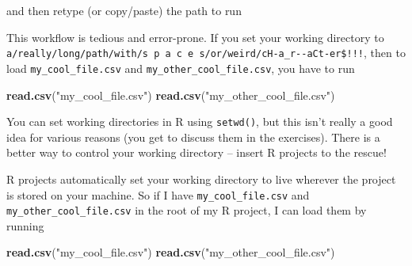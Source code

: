 \documentclass[
]{book}
\newenvironment{Shaded}{\begin{snugshade}}{\end{snugshade}}
\newcommand{\KeywordTok}[1]{\textcolor[rgb]{0.13,0.29,0.53}{\textbf{#1}}}
\newcommand{\NormalTok}[1]{#1}
\newcommand{\StringTok}[1]{\textcolor[rgb]{0.31,0.60,0.02}{#1}}
\begin{document}
\begin{Shaded}
\end{Shaded}

and then retype (or copy/paste) the path to run

\begin{Shaded}
\end{Shaded}

This workflow is tedious and error-prone. If you set your working directory to \texttt{a/really/long/path/with/s\ p\ a\ c\ e\ s/or/weird/cH-a\_r-\/-aCt-er\$!!!}, then to load \texttt{my\_cool\_file.csv} and \texttt{my\_other\_cool\_file.csv}, you have to run

\begin{Shaded}
\begin{Highlighting}[]
\KeywordTok{read.csv}\NormalTok{(}\StringTok{"my_cool_file.csv"}\NormalTok{)}
\KeywordTok{read.csv}\NormalTok{(}\StringTok{"my_other_cool_file.csv"}\NormalTok{)}
\end{Highlighting}
\end{Shaded}

You can set working directories in R using \texttt{setwd()}, but this isn't really a good idea for various reasons (you get to discuss them in the exercises). There is a better way to control your working directory -- insert R projects to the rescue!

R projects automatically set your working directory to live wherever the project is stored on your machine. So if I have \texttt{my\_cool\_file.csv} and \texttt{my\_other\_cool\_file.csv} in the root of my R project, I can load them by running

\begin{Shaded}
\begin{Highlighting}[]
\KeywordTok{read.csv}\NormalTok{(}\StringTok{"my_cool_file.csv"}\NormalTok{)}
\KeywordTok{read.csv}\NormalTok{(}\StringTok{"my_other_cool_file.csv"}\NormalTok{)}
\end{Highlighting}
\end{Shaded}
\end{document}
